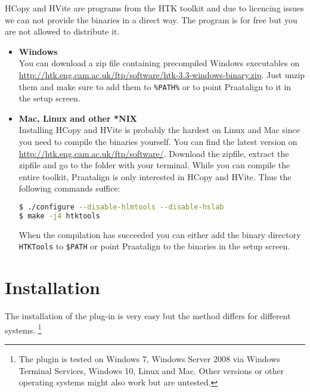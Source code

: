 \begin{itemize}
		HCopy and HVite are programs from the HTK toolkit and due to licencing
		issues we can not provide the binaries in a direct way. The program is for
		free but you are not allowed to distribute it.
		\begin{itemize}
			\item \textbf{Windows}\\
				You can download a zip file containing precompiled Windows executables
				on \url{http://htk.eng.cam.ac.uk/ftp/software/htk-3.3-windows-binary.zip}.
				Just unzip them and make sure to add them to \texttt{\%PATH\%} or to
				point Praatalign to it in the setup screen.
			\item \textbf{Mac, Linux and other *NIX}\\
				Installing HCopy and HVite is probably the hardest on Linux and Mac
				since you need to compile the binaries yourself. You can find the
				latest version on \url{http://htk.eng.cam.ac.uk/ftp/software/}.
				Download the zipfile, extract the zipfile and go to the folder with
				your terminal. While you can compile the entire toolkit, Praatalign is
				only interested in HCopy and HVite. Thus the following commands
				suffice:
				\begin{lstlisting}[language=bash]
$ ./configure --disable-hlmtools --disable-hslab
$ make -j4 htktools
				\end{lstlisting}
				When the compilation has succeeded you can either add the binary
				directory \texttt{HTKTools} to \texttt{\$PATH} or point Praatalign to
				the binaries in the setup screen.
		\end{itemize}
\end{itemize}

\section{Installation}
\label{sec:installation}
The installation of the plug-in is very easy but the method differs for
different systems. \footnote{The plugin is tested on Windows 7, Windows Server
2008 via Windows Terminal Services, Windows 10, Linux and Mac. Other versions
or other operating systems might also work but are untested.}

